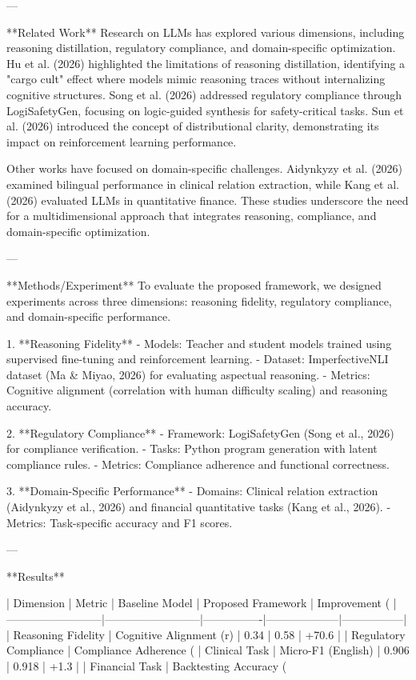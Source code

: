 ---

**Related Work**  
Research on LLMs has explored various dimensions, including reasoning distillation, regulatory compliance, and domain-specific optimization. Hu et al. (2026) highlighted the limitations of reasoning distillation, identifying a "cargo cult" effect where models mimic reasoning traces without internalizing cognitive structures. Song et al. (2026) addressed regulatory compliance through LogiSafetyGen, focusing on logic-guided synthesis for safety-critical tasks. Sun et al. (2026) introduced the concept of distributional clarity, demonstrating its impact on reinforcement learning performance.

Other works have focused on domain-specific challenges. Aidynkyzy et al. (2026) examined bilingual performance in clinical relation extraction, while Kang et al. (2026) evaluated LLMs in quantitative finance. These studies underscore the need for a multidimensional approach that integrates reasoning, compliance, and domain-specific optimization.

---

**Methods/Experiment**  
To evaluate the proposed framework, we designed experiments across three dimensions: reasoning fidelity, regulatory compliance, and domain-specific performance.

1. **Reasoning Fidelity**  
   - Models: Teacher and student models trained using supervised fine-tuning and reinforcement learning.  
   - Dataset: ImperfectiveNLI dataset (Ma & Miyao, 2026) for evaluating aspectual reasoning.  
   - Metrics: Cognitive alignment (correlation with human difficulty scaling) and reasoning accuracy.

2. **Regulatory Compliance**  
   - Framework: LogiSafetyGen (Song et al., 2026) for compliance verification.  
   - Tasks: Python program generation with latent compliance rules.  
   - Metrics: Compliance adherence and functional correctness.

3. **Domain-Specific Performance**  
   - Domains: Clinical relation extraction (Aidynkyzy et al., 2026) and financial quantitative tasks (Kang et al., 2026).  
   - Metrics: Task-specific accuracy and F1 scores.

---

**Results**  

| Dimension                | Metric                   | Baseline Model | Proposed Framework | Improvement (%
|--------------------------|--------------------------|----------------|--------------------|-----------------|
| Reasoning Fidelity       | Cognitive Alignment (r) | 0.34           | 0.58               | +70.6           |
| Regulatory Compliance    | Compliance Adherence (%
| Clinical Task            | Micro-F1 (English)      | 0.906          | 0.918              | +1.3            |
| Financial Task           | Backtesting Accuracy (%


